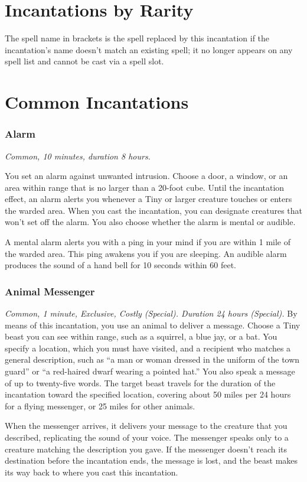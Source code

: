 \section{Incantations by Rarity}
The spell name in brackets is the spell replaced by this incantation if the incantation's name doesn't match an existing spell; it no longer appears on any spell list and cannot be cast via a spell slot.

\section{Common Incantations}
\subsubsection{Alarm }

\textit{Common, 10 minutes, duration 8 hours.}

You set an alarm against unwanted intrusion. Choose a door, a window, or an area within range that is no larger than a 20-foot cube. Until the incantation effect, an alarm alerts you whenever a Tiny or larger creature touches or enters the warded area. When you cast the incantation, you can designate creatures that won't set off the alarm. You also choose whether the alarm is mental or audible.

A mental alarm alerts you with a ping in your mind if you are within 1 mile of the warded area. This ping awakens you if you are sleeping. An audible alarm produces the sound of a hand bell for 10 seconds within 60 feet.

\subsubsection{Animal Messenger}
\textit{Common, 1 minute, Exclusive, Costly (Special). Duration 24 hours (Special).}
By means of this incantation, you use an animal to deliver a message. Choose a Tiny beast you can see within range, such as a squirrel, a blue jay, or a bat. You specify a location, which you must have visited, and a recipient who matches a general description, such as “a man or woman dressed in the uniform of the town guard” or “a red-haired dwarf wearing a pointed hat.” You also speak a message of up to twenty-five words. The target beast travels for the duration of the incantation toward the specified location, covering about 50 miles per 24 hours for a flying messenger, or 25 miles for other animals.

When the messenger arrives, it delivers your message to the creature that you described, replicating the sound of your voice. The messenger speaks only to a creature matching the description you gave. If the messenger doesn't reach its destination before the incantation ends, the message is lost, and the beast makes its way back to where you cast this incantation.

